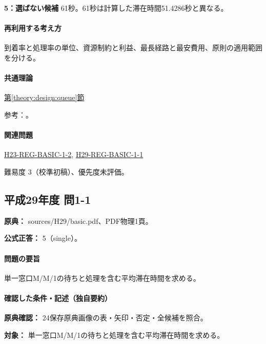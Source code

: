 \noindent\textbf{5：選ばない候補} 61秒。61秒は計算した滞在時間51.4286秒と異なる。\par

\paragraph{再利用する考え方} 到着率と処理率の単位、資源制約と利益、最長経路と最安費用、原則の適用範囲を分ける。

\paragraph{共通理論} \hyperref[theory:design:queue]{第\ref*{theory:design:queue}節}

\par 参考：\cite{design48_queue_ref}。

\paragraph{関連問題} \hyperref[q:h23-reg-basic-1-2]{H23-REG-BASIC-1-2}, \hyperref[q:h29-reg-basic-1-1]{H29-REG-BASIC-1-1}

\par 難易度 3（校準初稿）、優先度未評価。

\subsection{平成29年度 問1-1}
\label{q:h29-reg-basic-1-1}

\noindent\textbf{原典：} sources/H29/basic.pdf、PDF物理1頁。

\textbf{公式正答：} 5（single）。

\paragraph{問題の要旨} 単一窓口M/M/1の待ちと処理を含む平均滞在時間を求める。

\paragraph{確認した条件・記述（独自要約）}\mbox{}\par

\noindent\textbf{原典確認：} 24保存原典画像の表・矢印・否定・全候補を照合。\par

\noindent\textbf{対象：} 単一窓口M/M/1の待ちと処理を含む平均滞在時間を求める。\par

